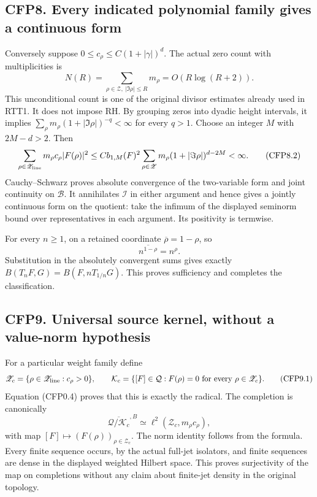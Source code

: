 \subsection{CFP8. Every indicated polynomial family gives a continuous
form}\label{cfp8.-every-indicated-polynomial-family-gives-a-continuous-form}

Conversely suppose \(0\le c_\rho\le C(1+|\gamma|)^d\). The actual zero
count with multiplicities is \[
N(R)=\sum_{\rho\in\mathscr Z,\ |\Im\rho|\le R}m_\rho
=O(R\log(R+2)).
\tag{CFP8.1}
\] This unconditional count is one of the original divisor estimates
already used in RTT1. It does not impose RH. By grouping zeros into
dyadic height intervals, it implies
\(\sum_\rho m_\rho(1+|\Im\rho|)^{-q}<\infty\) for every \(q>1\). Choose
an integer \(M\) with \(2M-d>2\). Then \[
\sum_{\rho\in\mathscr Z_{\rm line}}
m_\rho c_\rho |F(\rho)|^2
\le C b_{1,M}(F)^2
\sum_{\rho\in\mathscr Z}m_\rho(1+|\Im\rho|)^{d-2M}<\infty.
\tag{CFP8.2}
\] Cauchy--Schwarz proves absolute convergence of the two-variable form
and joint continuity on \(\mathcal B\). It annihilates \(\mathcal I\) in
either argument and hence gives a jointly continuous form on the
quotient: take the infimum of the displayed seminorm bound over
representatives in each argument. Its positivity is termwise.

For every \(n\ge1\), on a retained coordinate \(\overline\rho=1-\rho\),
so \[
\overline{n^{1-\rho}}=n^\rho.
\] Substitution in the absolutely convergent sums gives exactly
\(B(T_nF,G)=B(F,nT_{1/n}G)\). This proves sufficiency and completes the
classification.

\subsection{CFP9. Universal source kernel, without a value-norm
hypothesis}\label{cfp9.-universal-source-kernel-without-a-value-norm-hypothesis}

For a particular weight family define \[
\mathscr Z_c=\{\rho\in\mathscr Z_{\rm line}:c_\rho>0\},
\qquad
\mathcal K_c=\{[F]\in\mathcal Q:F(\rho)=0\text{ for every }\rho\in\mathscr Z_c\}.
\tag{CFP9.1}
\] Equation (CFP0.4) proves that this is exactly the radical. The
completion is canonically \[
\overline{\mathcal Q/\mathcal K_c}^{,B}
\simeq\ell^2(\mathscr Z_c,m_\rho c_\rho),
\tag{CFP9.2}
\] with map \([F]\mapsto(F(\rho))_{\rho\in\mathscr Z_c}\). The norm
identity follows from the formula. Every finite sequence occurs, by the
actual full-jet isolators, and finite sequences are dense in the
displayed weighted Hilbert space. This proves surjectivity of the map on
completions without any claim about finite-jet density in the original
topology.

